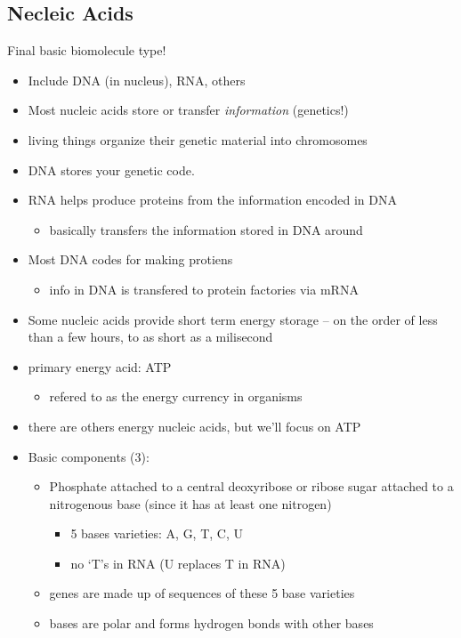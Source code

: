 \documentclass{article}
\theoremstyle{definition}
\begin{document}
\subsection{Necleic Acids}
Final basic biomolecule type!
\begin{itemize}
	\item Include DNA (in nucleus), RNA, others
	\item Most nucleic acids store or transfer \textit{information} (genetics!)
	\item living things organize their genetic material into chromosomes
	\item DNA stores your genetic code.
	\item RNA helps produce proteins from the information encoded in DNA
		\begin{itemize}
			\item basically transfers the information stored in DNA around
		\end{itemize}
	\item Most DNA codes for making protiens
		\begin{itemize}
			\item info in DNA is transfered to protein factories via mRNA
		\end{itemize}
	\item Some nucleic acids provide short term energy storage -- on the order of less than a few hours, to as short as a milisecond
	\item primary energy acid: ATP
		\begin{itemize}
			\item refered to as the energy currency in organisms
		\end{itemize}
	\item there are others energy nucleic acids, but we'll focus on ATP
	\item Basic components (3):
		\begin{itemize}
			\item Phosphate attached to a central deoxyribose or ribose sugar attached to a nitrogenous base (since it has at least one nitrogen)
				\begin{itemize}
					\item 5 bases varieties: A, G, T, C, U
					\item no `T's in RNA (U replaces T in RNA)
				\end{itemize}
			\item genes are made up of sequences of these 5 base varieties
			\item bases are polar and forms hydrogen bonds with other bases

\end{itemize}
\end{itemize}
\end{document}
